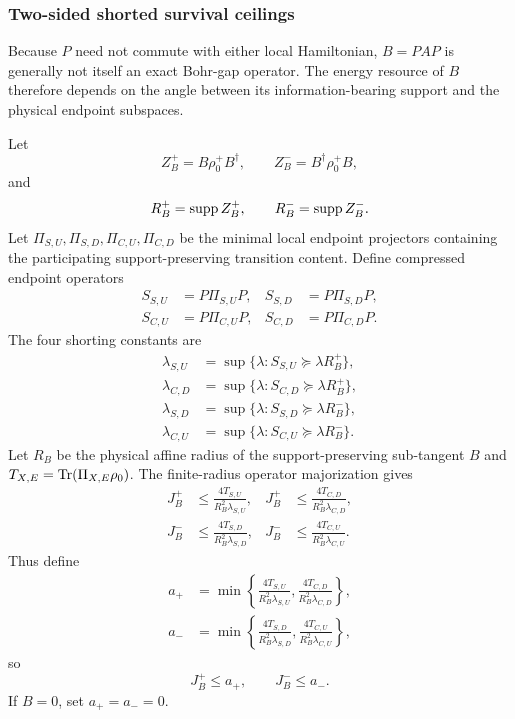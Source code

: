 \subsubsection{Two-sided shorted survival ceilings}

Because $P$ need not commute with either local Hamiltonian, $B=PAP$ is generally not itself an exact Bohr-gap operator. The energy resource of $B$ therefore depends on the angle between its information-bearing support and the physical endpoint subspaces.

Let
\begin{equation}
Z_B^+=B\rho_0^+B^\dagger,
\qquad
Z_B^-=B^\dagger\rho_0^+B,
\end{equation}
and
\begin{equation}
R_B^+=\operatorname{supp} Z_B^+,
\qquad
R_B^-=\operatorname{supp} Z_B^-.
\end{equation}
Let $\Pi_{S,U},\Pi_{S,D},\Pi_{C,U},\Pi_{C,D}$ be the minimal local endpoint projectors containing the participating support-preserving transition content. Define compressed endpoint operators
\begin{align}
S_{S,U}&=P\Pi_{S,U}P,&S_{S,D}&=P\Pi_{S,D}P,\\
S_{C,U}&=P\Pi_{C,U}P,&S_{C,D}&=P\Pi_{C,D}P.
\end{align}
The four shorting constants are
\begin{align}
\lambda_{S,U}&=\sup\{\lambda:S_{S,U}\succeq\lambda R_B^+\},\\
\lambda_{C,D}&=\sup\{\lambda:S_{C,D}\succeq\lambda R_B^+\},\\
\lambda_{S,D}&=\sup\{\lambda:S_{S,D}\succeq\lambda R_B^-\},\\
\lambda_{C,U}&=\sup\{\lambda:S_{C,U}\succeq\lambda R_B^-\}.
\end{align}
Let $R_B$ be the physical affine radius of the support-preserving sub-tangent $B$ and $T_{X,E}=\operatorname{Tr}(\Pi_{X,E}\rho_0)$. The finite-radius operator majorization gives
\begin{align}
J_B^+&\le\frac{4T_{S,U}}{R_B^2\lambda_{S,U}},&
J_B^+&\le\frac{4T_{C,D}}{R_B^2\lambda_{C,D}},\\
J_B^-&\le\frac{4T_{S,D}}{R_B^2\lambda_{S,D}},&
J_B^-&\le\frac{4T_{C,U}}{R_B^2\lambda_{C,U}}.
\end{align}
Thus define
\begin{align}
a_+&=
\min\!\left\{
\frac{4T_{S,U}}{R_B^2\lambda_{S,U}},
\frac{4T_{C,D}}{R_B^2\lambda_{C,D}}
\right\},\\
a_-&=
\min\!\left\{
\frac{4T_{S,D}}{R_B^2\lambda_{S,D}},
\frac{4T_{C,U}}{R_B^2\lambda_{C,U}}
\right\},
\end{align}
so
\begin{equation}
J_B^+\le a_+,
\qquad
J_B^-\le a_-.
\label{eq:mixed-proof-apm}
\end{equation}
If $B=0$, set $a_+=a_-=0$.

